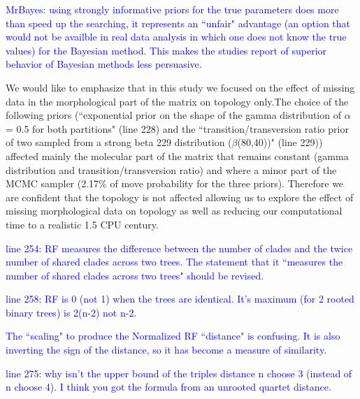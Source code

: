 \documentclass[11pt]{letter}
\begin{document}
\begin{letter}{}

\textcolor{blue}{MrBayes: using strongly informative priors for the true parameters does more than speed up the searching, it represents an ``unfair" advantage (an option that would not be availble in real data analysis in which one does not know the true values) for the Bayesian method. This makes the studies report of superior behavior of Bayesian methods less persuasive.}

We would like to emphasize that in this study we focused on the effect of missing data in the morphological part of the matrix on topology only.The choice of the following priors (``exponential prior on the shape of the gamma distribution of $\alpha$ = 0.5 for both partitions" (line 228) and the ``transition/transversion ratio prior of two sampled from a strong beta 229 distribution ($\beta$(80,40))" (line 229)) affected mainly the molecular part of the matrix that remains constant (gamma distribution and transition/transversion ratio) and where a minor part of the MCMC sampler (2.17\% of move probability for the three priors). Therefore we are confident that the topology is not affected allowing us to explore the effect of missing morphological data on topology as well as reducing our computational time to a realistic 1.5 CPU century.


\textcolor{blue}{line 254: RF measures the difference between the number of clades and the twice number of shared clades across two trees. The statement that it ``measures the number of shared clades across two trees" should be revised.}





\textcolor{blue}{line 258: RF is 0 (not 1) when the trees are identical. It's maximum (for 2 rooted binary trees) is 2(n-2) not n-2.}



\textcolor{blue}{The ``scaling" to produce the Normalized RF ``distance" is confusing. It is also inverting the sign of the distance, so it has become a measure of similarity.}



\textcolor{blue}{line 275: why isn't the upper bound of the triples distance n choose 3 (instead of n choose 4). I think you got the formula from an unrooted quartet distance.}


\end{letter}
\end{document}
